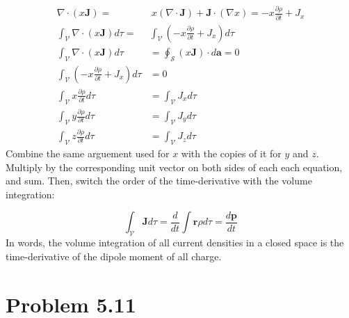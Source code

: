 \documentclass[10pt]{article}
\begin{document}
\begin{align}
\nabla \cdot (x \mathbf{J}) =& ~ x (\nabla \cdot \mathbf{J}) + \mathbf{J} \cdot (\nabla x) = -x \frac{\partial \rho}{\partial t} + J_x \\
\int_{\mathcal{V}} \nabla \cdot (x \mathbf{J}) d\tau =& \int_{\mathcal{V}} \left( -x \frac{\partial \rho}{\partial t} + J_x \right) d\tau \\
\int_{\mathcal{V}} \nabla \cdot (x \mathbf{J}) d\tau &= \oint_{\mathcal{S}} (x \mathbf{J}) \cdot d\mathbf{a} = 0 \\
\int_{\mathcal{V}} \left( -x \frac{\partial \rho}{\partial t} + J_x \right) d\tau &= 0 \\
\int_{\mathcal{V}} x \frac{\partial \rho}{\partial t} d\tau &= \int_{\mathcal{V}} J_x d\tau \\
\int_{\mathcal{V}} y \frac{\partial \rho}{\partial t} d\tau &= \int_{\mathcal{V}} J_y d\tau \\
\int_{\mathcal{V}} z \frac{\partial \rho}{\partial t} d\tau &= \int_{\mathcal{V}} J_z d\tau
\end{align}
\noindent
Combine the same arguement used for $x$ with the copies of it for $y$ and $z$.  Multiply by the corresponding unit vector on both sides of each each equation, and sum.  Then, switch the order of the time-derivative with the volume integration:

\begin{equation}
\int_\mathcal{V} \mathbf{J} d\tau = \frac{d}{dt}\int \mathbf{r} \rho d\tau = \frac{d\mathbf{p}}{dt}
\end{equation}
\noindent
In words, the volume integration of all current densities in a closed space is the time-derivative of the dipole moment of all charge.

\section{Problem 5.11}
\end{document}
